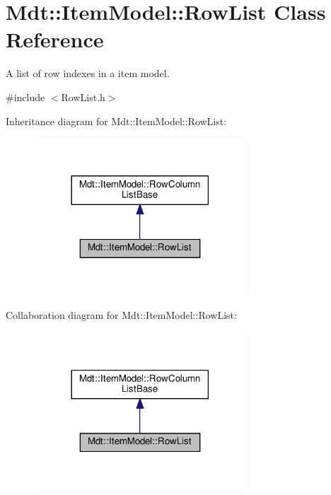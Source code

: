 \hypertarget{class_mdt_1_1_item_model_1_1_row_list}{}\section{Mdt\+:\+:Item\+Model\+:\+:Row\+List Class Reference}
\label{class_mdt_1_1_item_model_1_1_row_list}


A list of row indexes in a item model.  




{\ttfamily \#include $<$Row\+List.\+h$>$}



Inheritance diagram for Mdt\+:\+:Item\+Model\+:\+:Row\+List\+:\nopagebreak
\begin{figure}[H]
\begin{center}
\leavevmode
\includegraphics[width=225pt]{class_mdt_1_1_item_model_1_1_row_list__inherit__graph}
\end{center}
\end{figure}


Collaboration diagram for Mdt\+:\+:Item\+Model\+:\+:Row\+List\+:\nopagebreak
\begin{figure}[H]
\begin{center}
\leavevmode
\includegraphics[width=225pt]{class_mdt_1_1_item_model_1_1_row_list__coll__graph}
\end{center}
\end{figure}
